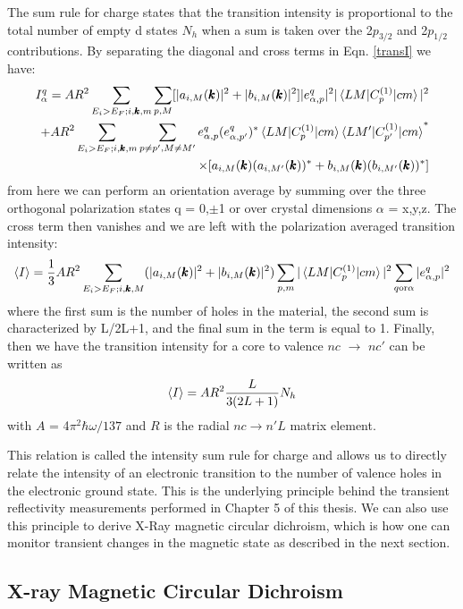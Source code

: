 The sum rule for charge states that the transition intensity is proportional to the total number of empty d states $N_h$ when a sum is taken over the 2$p_{3/2}$ and 2$p_{1/2}$ contributions. By separating the diagonal and cross terms in Eqn. \ref{transI} we have:
\begin{align}
I_{\alpha}^q=AR^2\sum_{E_i>E_F; i ,\pmb{k}, m}\sum_{p,M}[|a_{i,M}(\pmb{k})|^2+|b_{i,M}(\pmb{k})|^2]|e_{\alpha,p}^q|^2|\braket{LM|C_p^{(1)}|cm}|^2 \\
+ AR^2\sum_{E_i>E_F; i,\pmb{k},m}\sum_{p \neq p', M \neq M'}e^q_{\alpha,p}(e^q_{\alpha,p'})^*\braket{LM|C_p^{(1)}|cm}\braket{LM'|C_{p'}^{(1)}|cm}^* \\
\times [a_{i,M}(\pmb{k})(a_{i,M'}(\pmb{k}))^*+b_{i,M}(\pmb{k})(b_{i,M'}(\pmb{k}))^*]
\end{align}
from here we can perform an orientation average by summing over the three orthogonal polarization states q = 0,$\pm$1 or over crystal dimensions $\alpha$ = x,y,z. The cross term then vanishes and we are left with the polarization averaged transition intensity:
\begin{eqnarray}
\braket{I}=\frac{1}{3}AR^2\sum_{E_i>E_F; i,\pmb{k},M}(|a_{i,M}(\pmb{k})|^2+|b_{i,M}(\pmb{k})|^2)\sum_{p,m}|\braket{LM|C_p^{(1)}|cm}|^2\sum_{q \text{or} \alpha}|e_{\alpha,p}^q|^2
\end{eqnarray}
where the first sum is the number of holes in the material, the second sum is characterized by L/2L+1, and the final sum in the term is equal to 1. Finally, then we have the transition intensity for a core to valence $nc$ $\rightarrow$ $nc'$ can be written as
\begin{equation}
\braket{I} = AR^2\frac{L}{3(2L+1)}N_h
\end{equation}
with $A$ = 4$\pi^2\hbar\omega/137$ and $R$ is the radial $nc\rightarrow n'L$ matrix element.

This relation is called the intensity sum rule for charge and allows us to directly relate the intensity of an electronic transition to the number of valence holes in the electronic ground state. This is the underlying principle behind the transient reflectivity measurements performed in Chapter 5 of this thesis. We can also use this principle to derive X-Ray magnetic circular dichroism, which is how one can monitor transient changes in the magnetic state as described in the next section.

\subsection{X-ray Magnetic Circular Dichroism}

